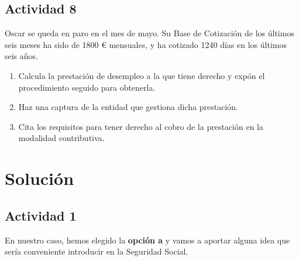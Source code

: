 \subsection{Actividad 8}
Oscar se queda en paro en el mes de mayo. Su Base de Cotización de los últimos seis meses ha sido de 1800 € mensuales, y ha cotizado 1240 días en los últimos seis años.

\begin{enumerate}
    \item Calcula la prestación de desempleo a la que tiene derecho y expón el procedimiento seguido para obtenerla.
    \item Haz una captura de la entidad que gestiona dicha prestación.
    \item Cita los requisitos para tener derecho al cobro de la prestación en la modalidad contributiva.
\end{enumerate}

\section{Solución}

\subsection{Actividad 1}
En nuestro caso, hemos elegido la \textbf{opción a} y vamos a aportar alguna idea que sería conveniente introducir en la Seguridad Social.





\newpage



